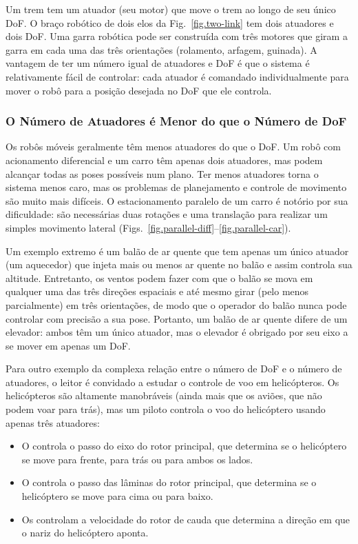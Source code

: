 Um trem tem um atuador (seu motor) que move o trem ao longo de seu único DoF. O braço robótico de dois elos da Fig.~\ref{fig.two-link} tem dois atuadores e dois DoF. Uma garra robótica pode ser construída com três motores que giram a garra em cada uma das três orientações (rolamento, arfagem, guinada). A vantagem de ter um número igual de atuadores e DoF é que o sistema é relativamente fácil de controlar: cada atuador é comandado individualmente para mover o robô para a posição desejada no DoF que ele controla.

\subsubsection*{O Número de Atuadores é Menor do que o Número de DoF}

Os robôs móveis geralmente têm menos atuadores do que o DoF. Um robô com acionamento diferencial e um carro têm apenas dois atuadores, mas podem alcançar todas as poses possíveis num plano. Ter menos atuadores torna o sistema menos caro, mas os problemas de planejamento e controle de movimento são muito mais difíceis. O estacionamento paralelo de um carro é notório por sua dificuldade: são necessárias duas rotações e uma translação para realizar um simples movimento lateral (Figs.~\ref{fig.parallel-diff}--\ref{fig.parallel-car}).

Um exemplo extremo é um balão de ar quente que tem apenas um único atuador (um aquecedor) que injeta mais ou menos ar quente no balão e assim controla sua altitude. Entretanto, os ventos podem fazer com que o balão se mova em qualquer uma das três direções espaciais e até mesmo girar (pelo menos parcialmente) em três orientações, de modo que o operador do balão nunca pode controlar com precisão a sua pose. Portanto, um balão de ar quente difere de um elevador: ambos têm um único atuador, mas o elevador é obrigado por seu eixo a se mover em apenas um DoF.

Para outro exemplo da complexa relação entre o número de DoF e o número de atuadores, o leitor é convidado a estudar o controle de voo em helicópteros. Os helicópteros são altamente manobráveis (ainda mais que os aviões, que não podem voar para trás), mas um piloto controla o voo do helicóptero usando apenas três atuadores:
\begin{itemize}
\item O  controla o passo do eixo do rotor principal, que determina se o helicóptero se move para frente, para trás ou para ambos os lados.
\item O  controla o passo das lâminas do rotor principal, que determina se o helicóptero se move para cima ou para baixo.
\item Os  controlam a velocidade do rotor de cauda que determina a direção em que o nariz do helicóptero aponta.
\end{itemize}

